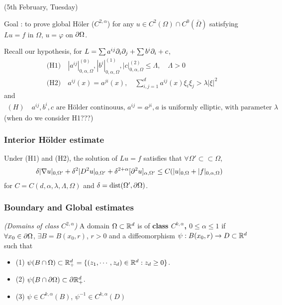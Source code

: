 \documentclass[12pt,a4paper]{article}
\renewenvironment{i}
{\begin{itemize} 
	}%
	{\end{itemize}
}
\begin{document}
\newday

(5th February, Tuesday)
\s

Goal : to prove global H\"oler ($C^{2, \alpha}$) for any $u\in C^2(\Omega) \cap C^0(\bar{\Omega})$ satisfying $Lu =f$ in $\Omega$, $u =\varphi$ on $\partial \Omega$.

Recall our hypothesis, for $L = \sum a^{ij}\partial_i \partial_j + \sum b^i \partial_i +c$,
\begin{align*}
&\text{(H1)} \quad |a^{ij}|_{0, \alpha, \Omega}^{(0)}, |b^i|^{(1)}_{0, \alpha, \Omega}, |c|^{(2)}_{0, \alpha, \Omega}\leq \Lambda, \quad \Lambda>0 \\
&\text{(H2)} \quad a^{ij}(x) = a^{ji}(x), \quad \sum_{i,j=1}^d a^{ij}(x) \xi_i \xi_j > \lambda |\xi|^2
\end{align*}
and
\begin{align*}
(H) \quad a^{ij}, b^i, c \text{ are H\"older continouus, } a^{ij}=a^{ji}, a \text{ is uniformly elliptic, with parameter } \lambda
\end{align*}
(when do we consider H1???)
\s

\subsubsection*{Interior H\"older estimate}

\corr Under (H1) and (H2), the solution of $Lu =f$ satisfies that $\forall \Omega' \subset\subset \Omega$,
\begin{align*}
\delta |\nabla u |_{0, \Omega'} + \delta^2 |D^2 u|_{0, \Omega'} + \delta^{2+ \alpha}[\partial^2 u]_{\alpha, \Omega'}\leq C(|u|_{0, \Omega}+ |f|_{0, \alpha, \Omega})
\end{align*}
for $C = C(d, \alpha, \lambda, \Lambda, \Omega)$ and $\delta= \text{dist}(\Omega', \partial \Omega)$. 
\s

\subsubsection*{Boundary and Global estimates}

 \emph{(Domains of class $C^{2, \alpha}$)} A domain  $\Omega \subset \mathbb{R}^d$ is of \textbf{class $C^{k, \alpha}$, $0\leq \alpha \leq 1$} if $\forall x_0 \in \partial \Omega$, $\exists B = B(x_0, r)$, $r>0$ and a diffeomorphism $\psi : B(x_0, r) \rightarrow D\subset \mathbb{R}^d$ such that
\begin{i}
\item[(1)] $\psi(B\cap \Omega) \subset \mathbb{R}^d_+ = \{(z_1, \cdots, z_d) \in \mathbb{R}^d: z_d \geq 0 \}$.
\item[(2)] $\psi(B\cap \partial \Omega) \subset \partial \mathbb{R}_+^d$.
\item[(3)] $\psi \in C^{k, \alpha}(B)$, $\psi^{-1} \in C^{k, \alpha}(D)$ 
\end{i}
\s
\end{document}
